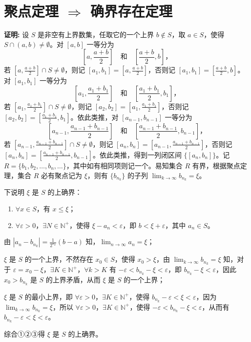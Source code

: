 \documentclass[lang=cn,newtx,10pt,scheme=chinese]{elegantbook}
\begin{document}
\section*{聚点定理 $\Rightarrow$ 确界存在定理}

\textbf{证明:} 设 $S$ 是非空有上界数集，任取它的一个上界 $b \notin S$，取 $a \in S$，使得 $S \cap (a, b) \neq \emptyset$。对 $[a, b]$ 一等分为
\[
\left[a, \frac{a + b}{2}\right] \quad \text{和} \quad \left[\frac{a + b}{2}, b\right]，
\]
若 $\left[a, \frac{a + b}{2}\right] \cap S \neq \emptyset$，则记 $[a_1, b_1] = \left[a, \frac{a + b}{2}\right]$，否则记 $[a_1, b_1] = \left[\frac{a + b}{2}, b\right]$。对 $[a_1, b_1]$ 一等分为
\[
\left[a_1, \frac{a_1 + b_1}{2}\right] \quad \text{和} \quad \left[\frac{a_1 + b_1}{2}, b_1\right]，
\]
若 $\left[a_1, \frac{a_1 + b_1}{2}\right] \cap S \neq \emptyset$，则记 $[a_2, b_2] = \left[a_1, \frac{a_1 + b_1}{2}\right]$，否则记 $[a_2, b_2] = \left[\frac{a_1 + b_1}{2}, b_1\right]$。依此类推，对 $[a_{n-1}, b_{n-1}]$ 一等分为
\[
\left[a_{n-1}, \frac{a_{n-1} + b_{n-1}}{2}\right] \quad \text{和} \quad \left[\frac{a_{n-1} + b_{n-1}}{2}, b_{n-1}\right]，
\]
若 $\left[a_{n-1}, \frac{a_{n-1} + b_{n-1}}{2}\right] \cap S \neq \emptyset$，则记 $[a_n, b_n] = \left[a_{n-1}, \frac{a_{n-1} + b_{n-1}}{2}\right]$，否则记 $[a_n, b_n] = \left[\frac{a_{n-1} + b_{n-1}}{2}, b_{n-1}\right]$。依此类推，得到一列闭区间 $\{[a_n, b_n]\}$。记 $R = \{b_1, b_2, \ldots, b_n, \ldots\}$，其中如有相同项则记一个。易知集合 $R$ 有界，根据聚点定理，集合 $R$ 必有聚点记为 $\xi$，则有 $\{b_{n_k}\}$ 的子列 $\lim_{k \to \infty} b_{n_k} = \xi$。

下说明 $\xi$ 是 $S$ 的上确界：
\begin{enumerate}
    \item $\forall x \in S$，有 $x \leq \xi$；
    \item $\forall \varepsilon > 0$，$\exists N \in \mathbb{N}^+$，使得 $\xi - a_n < \varepsilon$，即 $b < \xi + \varepsilon$，其中 $a_n \in S$。
\end{enumerate}
\begin{change}
\item 由 $|a_n - b_{n_k}| = \frac{1}{2^{n_k}} (b - a)$ 知，$\lim_{n \to \infty} a_n = \xi$；
\item $\xi$ 是 $S$ 的一个上界，不然存在 $x_0 \in S$，使得 $x_0 > \xi$，由 $\lim_{k \to \infty} b_{n_k} = \xi$ 知，对于 $\varepsilon = x_0 - \xi$，$\exists K \in \mathbb{N}^+$，$\forall k > K$ 有 $-\varepsilon < b_{n_k} - \xi < \varepsilon$，即 $b_{n_k} - \xi < \varepsilon$，因此 $x_0 > b_{n_k}$ 是 $S$ 的上界矛盾，从而 $\xi$ 是 $S$ 的一个上界；
 \item $\xi$ 是 $S$ 的最小上界，即 $\forall \varepsilon > 0$，$\exists K \in \mathbb{N}^+$，使得 $b_{n_k} - \varepsilon < \xi < \varepsilon$，因为 $\lim_{k \to \infty} b_{n_k} = \xi$，所以 $\forall \varepsilon > 0$，$\exists K \in \mathbb{N}^+$，使得 $-\varepsilon < b_{n_k} - \xi < \varepsilon$，从而有 $b_{n_k} - \varepsilon < \xi < \varepsilon$。

综合①②③得 $\xi$ 是 $S$ 的上确界。
\end{change}
\end{document}
